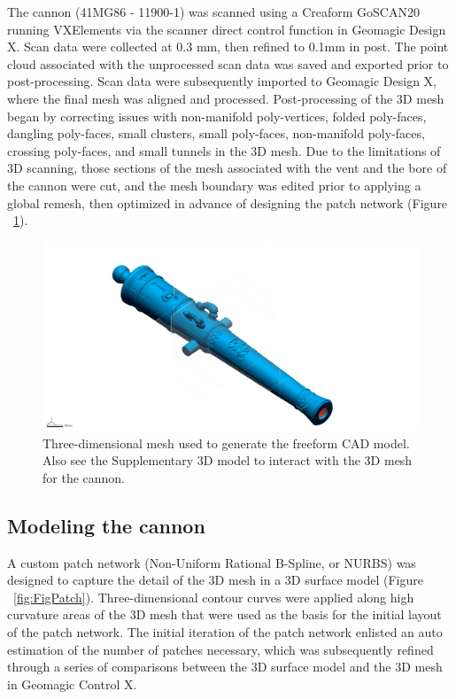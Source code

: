 \documentclass[review]{elsarticle}
\begin{document}
The cannon (41MG86 - 11900-1) was scanned using a Creaform GoSCAN20 running VXElements via the scanner direct control function in Geomagic Design X. Scan data were collected at 0.3 mm, then refined to 0.1mm in post. The point cloud associated with the unprocessed scan data was saved and exported prior to post-processing. Scan data were subsequently imported to Geomagic Design X, where the final mesh was aligned and processed. Post-processing of the 3D mesh began by correcting issues with non-manifold poly-vertices, folded poly-faces, dangling poly-faces, small clusters, small poly-faces, non-manifold poly-faces, crossing poly-faces, and small tunnels in the 3D mesh. Due to the limitations of 3D scanning, those sections of the mesh associated with the vent and the bore of the cannon were cut, and the mesh boundary was edited prior to applying a global remesh, then optimized in advance of designing the patch network (Figure ~\ref{fig:Fig2}).

\begin{figure}[ht]\centering
\includegraphics[width=\linewidth]{FigLSC2}
\caption{Three-dimensional mesh used to generate the freeform CAD model. Also see the Supplementary 3D model to interact with the 3D mesh for the cannon.}
\label{fig:Fig2}
\end{figure}

\subsection*{Modeling the cannon}

A custom patch network (Non-Uniform Rational B-Spline, or NURBS) was designed to capture the detail of the 3D mesh in a 3D surface model (Figure ~\ref{fig:FigPatch}). Three-dimensional contour curves were applied along high curvature areas of the 3D mesh that were used as the basis for the initial layout of the patch network. The initial iteration of the patch network enlisted an auto estimation of the number of patches necessary, which was subsequently refined through a series of comparisons between the 3D surface model and the 3D mesh in Geomagic Control X.
\end{document}

